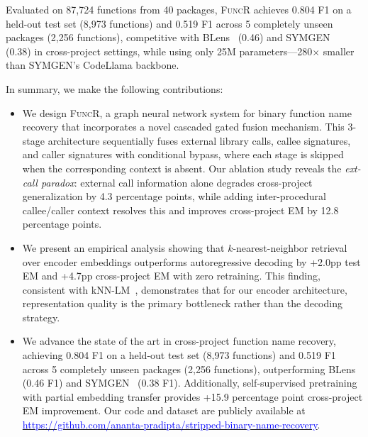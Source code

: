 \documentclass[sigconf,nonacm]{acmart}
\newcommand{\sysname}{\textsc{FuncR}}
\begin{document}
Evaluated on 87,724 functions from 40 packages, \sysname{} achieves 0.804 F1 on a held-out test set (8,973 functions) and 0.519 F1 across 5 completely unseen packages (2,256 functions), competitive with BLens~\cite{blens} (0.46) and SYMGEN~\cite{symgen} (0.38) in cross-project settings, while using only 25M parameters---280$\times$ smaller than SYMGEN's CodeLlama backbone.

In summary, we make the following contributions:

\begin{itemize}
    \item We design \sysname{}, a graph neural network system for binary function name recovery that incorporates a novel cascaded gated fusion mechanism. This 3-stage architecture sequentially fuses external library calls, callee signatures, and caller signatures with conditional bypass, where each stage is skipped when the corresponding context is absent. Our ablation study reveals the \emph{ext-call paradox}: external call information alone degrades cross-project generalization by 4.3 percentage points, while adding inter-procedural callee/caller context resolves this and improves cross-project EM by 12.8 percentage points.

    \item We present an empirical analysis showing that $k$-nearest-neighbor retrieval over encoder embeddings outperforms autoregressive decoding by +2.0pp test EM and +4.7pp cross-project EM with zero retraining. This finding, consistent with kNN-LM~\cite{knnlm}, demonstrates that for our encoder architecture, representation quality is the primary bottleneck rather than the decoding strategy.

    \item We advance the state of the art in cross-project function name recovery, achieving 0.804 F1 on a held-out test set (8,973 functions) and 0.519 F1 across 5 completely unseen packages (2,256 functions), outperforming BLens~\cite{blens} (0.46 F1) and SYMGEN~\cite{symgen} (0.38 F1). Additionally, self-supervised pretraining with partial embedding transfer provides +15.9 percentage point cross-project EM improvement. Our code and dataset are publicly available at \href{https://github.com/ananta-pradipta/stripped-binary-name-recovery}{\textcolor{blue}{https://github.com/\allowbreak{}ananta-pradipta/\allowbreak{}stripped-binary-name-recovery}}.
\end{itemize}

\end{document}
